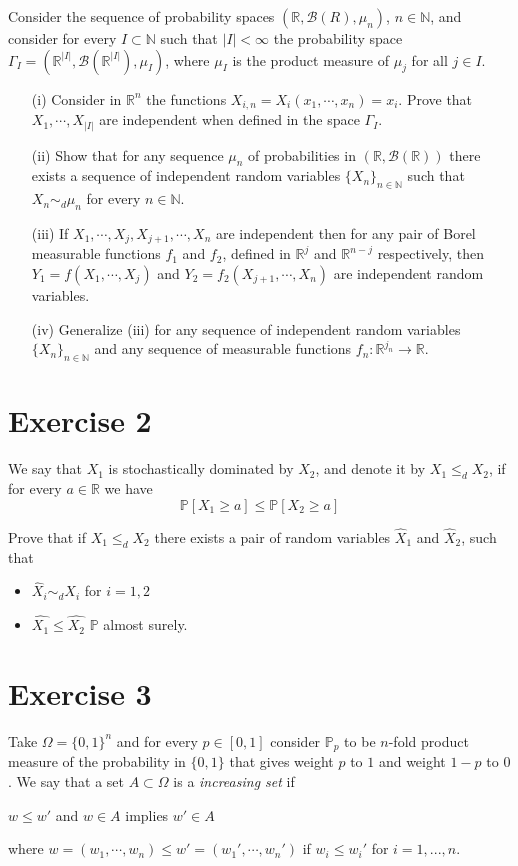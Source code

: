 \documentclass[a4paper,10pt]{article}
\newcommand{\Pro}{\mathbb{P}}
\newcommand{\N}{\mathbb{N}}
\newcommand{\R}{\mathbb{R}}
\newcommand{\B}{\mathcal{B}}
\begin{document}
Consider the sequence of probability spaces $(\R,\B(R),\mu_n)$, $n\in\N$, and consider for every $I \subset \N$ 
such that $|I|<\infty$ the probability space $\Gamma_I=(\R^{|I|},\B(\R^{|I|}), \mu_I)$, where $\mu_I$ is the 
product measure of $\mu_j$ for all $j\in I$.
\begin{enumerate}
 \item[(i)] Consider in $\R^n$ the functions $X_{i,n}=X_i(x_1,\cdots,x_n)=x_i$. 
 Prove that  $X_1,\cdots,X_{|I|}$ are independent when defined in the space $\Gamma_I$.
 \item[(ii)] Show that for any sequence $\mu_n$ of probabilities in $(\R,\B(\R))$
 there exists a sequence of independent random variables $\{X_n\}_{n\in\N}$ such that $X_n\sim_d \mu_n$ for every $n\in\N$.
 \item[(iii)] If $X_1,\cdots,X_j,X_{j+1},\cdots,X_n$ are independent then for any pair of Borel measurable functions 
 $f_1$ and $f_2$, defined in $\R^j$ and $\R^{n-j}$ respectively, then $Y_1=f(X_1,\cdots,X_j)$ and $Y_2=f_2(X_{j+1},\cdots,X_n)$ are
 independent random variables.
 \item[(iv)] Generalize (iii) for any sequence of independent random variables $\{X_n\}_{n\in\N}$ and any sequence of measurable 
 functions $f_n:\R^{j_n}\rightarrow \R$.
\end{enumerate}


\section*{Exercise 2}
We say that $X_1$ is stochastically dominated by $X_2$, and denote it by $X_1\leq_dX_2$,  if for every $a \in \R$ we have
$$\Pro[X_1\geq a]\leq \Pro[X_2 \geq a]$$

Prove that if $X_1 \leq_d X_2$ there exists a pair of random variables $\hat{X}_1$ and $\hat{X}_2$, such that

\begin{itemize}
\item $\hat{X}_i\sim_d X_i$ for $i=1,2$
\item $\hat{X_1}\leq \hat{X_2}$ $\Pro$ almost surely.
\end{itemize}

\section*{Exercise 3}
Take $\Omega=\{0,1\}^n$ and for every $p\in[0,1]$ consider $\Pro_p$ to be $n$-fold product measure of the probability in 
$\{0,1\}$ that gives weight $p$ to $1$ and weight $1-p$ to $0$. We say that a set $A \subset \Omega$ is a 
\textit{increasing set} if 
\begin{center}
 $w \leq w'$ and $w \in A$  implies $w' \in A$
\end{center}
where $w=(w_1,\cdots,w_n )\leq w'=(w_1',\cdots,w_n')$ if $w_i\leq w_i'$ for $i=1,...,n$. 
\end{document}
